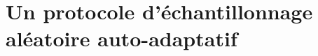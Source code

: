 
\chapter{Un protocole d'échantillonnage aléatoire auto-adaptatif}
\label{net:chap:spray}
\minitoc



%













